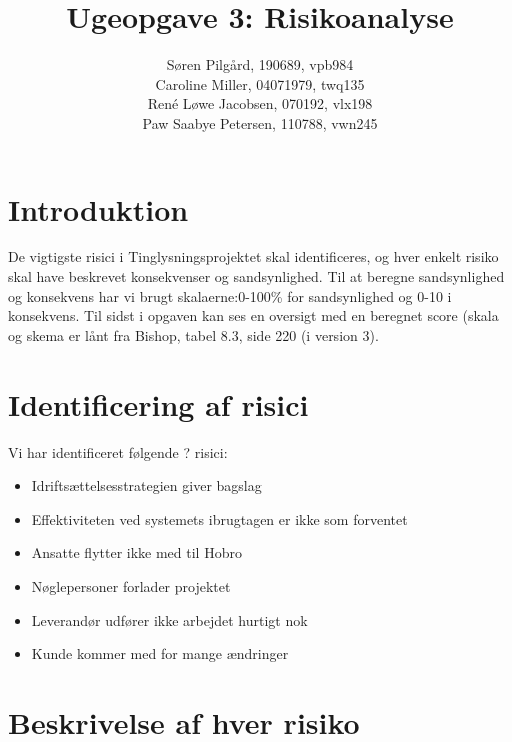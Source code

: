 \documentclass[10pt,a4paper,danish]{article}
\title{Ugeopgave 3: Risikoanalyse}
\author{Søren Pilgård, 190689, vpb984\\
Caroline Miller, 04071979, twq135\\
René Løwe Jacobsen, 070192, vlx198\\
Paw Saabye Petersen, 110788, vwn245}
\begin{document}
\maketitle
\newpage


\section{Introduktion}
De vigtigste risici i Tinglysningsprojektet skal identificeres, og hver enkelt risiko skal have beskrevet konsekvenser og sandsynlighed. Til at beregne sandsynlighed og konsekvens har vi brugt skalaerne:0-100\% for sandsynlighed og 0-10 i konsekvens. Til sidst i opgaven kan ses en oversigt med en beregnet score (skala og skema er lånt fra Bishop, tabel 8.3, side 220 (i version 3).

\section{Identificering af risici}
Vi har identificeret følgende ? risici:
\begin{itemize}
\item Idriftsættelsesstrategien giver bagslag
\item Effektiviteten ved systemets ibrugtagen er ikke som forventet
\item Ansatte flytter ikke med til Hobro 
\item Nøglepersoner forlader projektet
\item Leverandør udfører ikke arbejdet hurtigt nok
\item Kunde kommer med for mange ændringer
\end{itemize}

\section{Beskrivelse af hver risiko}
\end{document}
